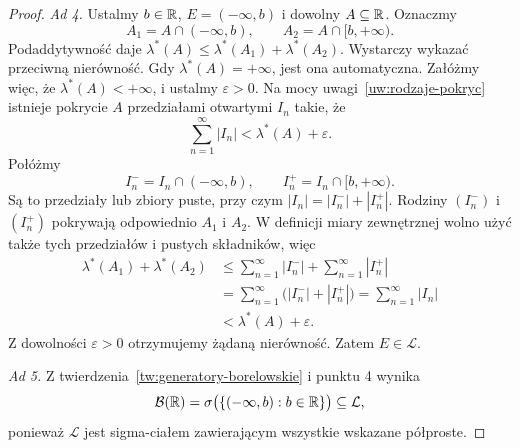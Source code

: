 \begin{proof}
\emph{Ad 4.}
Ustalmy $b\in\mathbb{R}$, $E=(-\infty,b)$ i dowolny $A\subseteq\mathbb{R}$.
Oznaczmy
\[
  A_1=A\cap(-\infty,b),\qquad A_2=A\cap[b,+\infty).
\]
Podaddytywność daje
$\lambda^{\ast}(A)\leq\lambda^{\ast}(A_1)+\lambda^{\ast}(A_2)$.
Wystarczy wykazać przeciwną nierówność.
Gdy $\lambda^{\ast}(A)=+\infty$, jest ona automatyczna.
Załóżmy więc, że $\lambda^{\ast}(A)<+\infty$, i ustalmy
$\varepsilon>0$. Na mocy uwagi~\ref{uw:rodzaje-pokryc} istnieje
pokrycie $A$ przedziałami otwartymi $I_n$ takie, że
\[
  \sum_{n=1}^{\infty}|I_n|<\lambda^{\ast}(A)+\varepsilon.
\]
Połóżmy
\[
  I_n^-=I_n\cap(-\infty,b),\qquad
  I_n^+=I_n\cap[b,+\infty).
\]
Są to przedziały lub zbiory puste, przy czym
$|I_n|=|I_n^-|+|I_n^+|$.
Rodziny $(I_n^-)$ i $(I_n^+)$ pokrywają odpowiednio $A_1$ i $A_2$.
W definicji miary zewnętrznej wolno użyć także tych przedziałów
i pustych składników, więc
\begin{align*}
  \lambda^{\ast}(A_1)+\lambda^{\ast}(A_2)
    &\leq\sum_{n=1}^{\infty}|I_n^-|+\sum_{n=1}^{\infty}|I_n^+|\\
    &=\sum_{n=1}^{\infty}\bigl(|I_n^-|+|I_n^+|\bigr)
      =\sum_{n=1}^{\infty}|I_n|\\
    &<\lambda^{\ast}(A)+\varepsilon.
\end{align*}
Z dowolności $\varepsilon>0$ otrzymujemy żądaną nierówność.
Zatem $E\in\mathcal{L}$.

\emph{Ad 5.}
Z twierdzenia~\ref{tw:generatory-borelowskie} i punktu 4 wynika
\[
  \mathcal{B}(\mathbb{R})
  =\sigma\bigl(\{(-\infty,b):b\in\mathbb{R}\}\bigr)
  \subseteq\mathcal{L},
\]
ponieważ $\mathcal{L}$ jest sigma-ciałem zawierającym wszystkie
wskazane półproste.
\end{proof}

